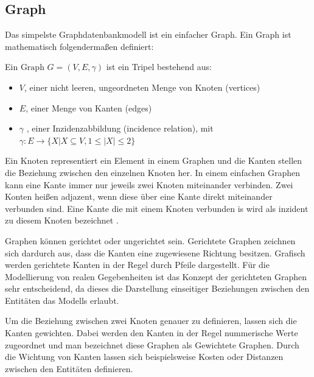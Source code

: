 \subsection{Graph}
Das simpelste Graphdatenbankmodell ist ein einfacher Graph.
Ein Graph ist mathematisch folgendermaßen definiert:
\begin{definition}
	Ein $\text{Graph } G=(V,E,\gamma)$ ist ein Tripel bestehend aus:
	\begin{itemize}
		\item $V$, einer nicht leeren, ungeordneten Menge von Knoten (vertices)
		\item $E$, einer Menge von Kanten (edges)
		\item $\gamma$ , einer Inzidenzabbildung (incidence relation), mit\\
		$\gamma : E \longrightarrow \{X | X \subseteq V, 1 \leq |X| \leq 2\}$
	\end{itemize}
	\cite[Seite 21]{pbeck01}
\end{definition}
Ein Knoten representiert ein Element in einem Graphen und die Kanten stellen die Beziehung zwischen den einzelnen Knoten her.
In einem einfachen Graphen kann eine Kante immer nur jeweils zwei Knoten miteinander verbinden.
Zwei Konten heißen adjazent, wenn diese über eine Kante direkt miteinander verbunden sind.
Eine Kante die mit einem Knoten verbunden is wird als inzident zu diesem Knoten bezeichnet \cite{knauer2015diskrete}.

Graphen können gerichtet oder ungerichtet sein.
Gerichtete Graphen zeichnen sich dardurch aus, dass die Kanten eine zugewiesene Richtung besitzen.
Grafisch werden gerichtete Kanten in der Regel durch Pfeile dargestellt.
Für die Modellierung von realen Gegebenheiten ist das Konzept der gerichteten Graphen sehr entscheidend, da dieses die Darstellung einseitiger Beziehungen zwischen den Entitäten das Modells erlaubt.

Um die Beziehung zwischen zwei Knoten genauer zu definieren, lassen sich die Kanten gewichten.
Dabei werden den Kanten in der Regel nummerische Werte zugeordnet und man bezeichnet diese Graphen als Gewichtete Graphen.
Durch die Wichtung von Kanten lassen sich beispielsweise Kosten oder Distanzen zwischen den Entitäten definieren.

